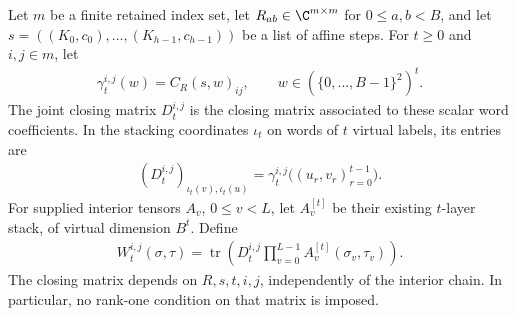 \begin{definition}
    \label{def:retained_stack_core}
    \leanok
    Let $m$ be a finite retained index set, let
    $R_{ab}\in\C^{m\times m}$ for $0\le a,b<B$, and let
    $s=((K_0,c_0),\ldots,(K_{h-1},c_{h-1}))$ be a list of affine steps.
    For $t\ge0$ and $i,j\in m$, let
    \begin{align}
        \gamma_t^{i,j}(w)=C_R(s,w)_{ij},
        \qquad w\in(\{0,\ldots,B-1\}^2)^t.
        \label{eq:retained_stack_scalar_coefficient}
    \end{align}
    The joint closing matrix $D_t^{i,j}$ is the closing matrix associated to
    these scalar word coefficients. In the stacking coordinates $\iota_t$
    on words of $t$ virtual labels, its entries are
    \begin{align}
        (D_t^{i,j})_{\iota_t(v),\iota_t(u)}
        =\gamma_t^{i,j}\bigl((u_r,v_r)_{r=0}^{t-1}\bigr).
        \label{eq:retained_stack_closing_entries}
    \end{align}
    For supplied interior tensors $A_v$, $0\le v<L$, let $A_v^{[t]}$ be
    their existing $t$-layer stack, of virtual dimension $B^t$. Define
    \begin{align}
        W_t^{i,j}(\sigma,\tau)=\operatorname{tr}\left(
        D_t^{i,j}\prod_{v=0}^{L-1}A_v^{[t]}(\sigma_v,\tau_v)\right).
        \label{eq:retained_stack_core}
    \end{align}
    The closing matrix depends on $R,s,t,i,j$, independently of the interior
    chain. In particular, no rank-one condition on that matrix is imposed.
\end{definition}

